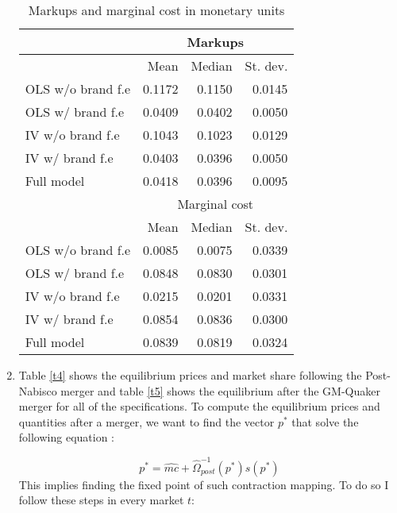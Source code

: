 \documentclass[12pt,english]{article}
\begin{document}
\begin{enumerate}
\begin{table}[H]
  \centering
  \caption{Markups and marginal cost in monetary units}
    \begin{tabular}{lrrr}
    \hline
          & \multicolumn{3}{c}{Markups} \\
    \hline
          & Mean  & Median & St. dev. \\
          \hline
    OLS w/o brand f.e & 0.1172 & 0.1150 & 0.0145 \\
    OLS w/ brand f.e & 0.0409 & 0.0402 & 0.0050 \\
    IV w/o brand f.e & 0.1043 & 0.1023 & 0.0129 \\
    IV w/ brand f.e & 0.0403 & 0.0396 & 0.0050 \\
    Full model & 0.0418 & 0.0396 & 0.0095 \\
    \hline
          & \multicolumn{3}{c}{Marginal cost} \\
          \hline
          & Mean  & Median & St. dev. \\
          \hline
    OLS w/o brand f.e & 0.0085 & 0.0075 & 0.0339 \\
    OLS w/ brand f.e & 0.0848 & 0.0830 & 0.0301 \\
    IV w/o brand f.e & 0.0215 & 0.0201 & 0.0331 \\
    IV w/ brand f.e & 0.0854 & 0.0836 & 0.0300 \\
    Full model & 0.0839 & 0.0819 & 0.0324 \\
    \hline
    \end{tabular}%
  \label{t3}%
\end{table}


\item Table \eqref{t4} shows the equilibrium prices and market share following the Post-Nabisco merger and table \eqref{t5} shows the equilibrium after the GM-Quaker merger for all of the specifications.
To compute the equilibrium prices and quantities after a merger, we want to find the vector $p^{*}$ that solve the following equation :

\[
p^{*}=\hat{mc}+\hat{\Omega}_{post}^{-1}(p^{*})s(p^{*})
\]
This implies finding the fixed point of such contraction mapping. To do so I follow these steps in every market $t$:


\end{enumerate}
\end{document}
